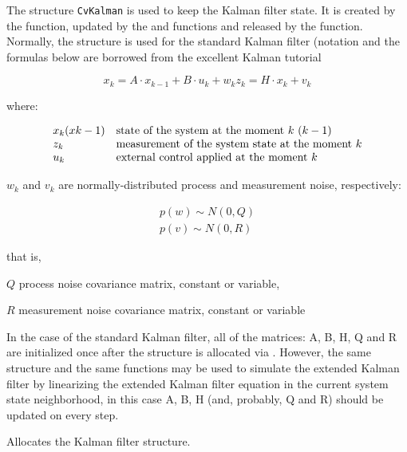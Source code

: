 The structure \texttt{CvKalman} is used to keep the Kalman filter
state. It is created by the  function, updated
by the  and  functions
and released by the  function. Normally, the
structure is used for the standard Kalman filter (notation and the
formulas below are borrowed from the excellent Kalman tutorial

\[
x_k=A \cdot x_{k-1}+B \cdot u_k+w_k
z_k=H \cdot x_k+v_k
\]

where:

\[
\begin{array}{l l}
x_k (x{k-1}) & \text{state of the system at the moment $k$ $(k-1)$ }\\
z_k & \text{measurement of the system state at the moment $k$}\\
u_k & \text{external control applied at the moment $k$}
\end{array}
\]

$w_k$ and $v_k$ are normally-distributed process and measurement noise, respectively:

\[
\begin{array}{l}
p(w) \sim N(0,Q)\\
p(v) \sim N(0,R)
\end{array}
\]

that is,

$Q$ process noise covariance matrix, constant or variable,

$R$ measurement noise covariance matrix, constant or variable

In the case of the standard Kalman filter, all of the matrices: A, B, H, Q and R are initialized once after the  structure is allocated via . However, the same structure and the same functions may be used to simulate the extended Kalman filter by linearizing the extended Kalman filter equation in the current system state neighborhood, in this case A, B, H (and, probably, Q and R) should be updated on every step.

Allocates the Kalman filter structure.


\begin{description}
\end{description}

